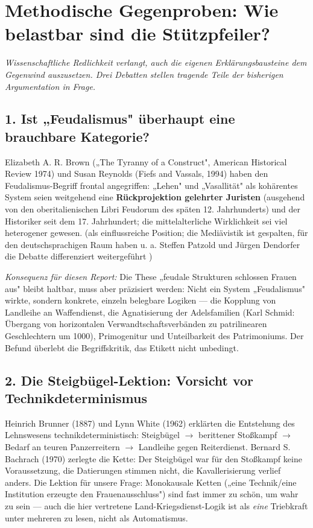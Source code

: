 \documentclass[11pt,a4paper,ngerman]{scrartcl}
\newcommand{\chipbase}[2]{\hspace{0pt}{\footnotesize\textcolor{#1}{[\textsc{#2}]}}}
\newcommand{\chipbelegt}[1]{\chipbase{chipgreen}{#1}}
\newcommand{\chipplausibel}[1]{\chipbase{chipamber}{#1}}
\newcommand{\chipumstritten}[1]{\chipbase{chipred}{#1}}
\begin{document}
\section{Methodische Gegenproben: Wie belastbar sind die Stützpfeiler?}

\noindent\textit{Wissenschaftliche Redlichkeit verlangt, auch die eigenen Erklärungsbausteine dem Gegenwind auszusetzen. Drei Debatten stellen tragende Teile der bisherigen Argumentation in Frage.}
\medskip

\subsection*{1. Ist „Feudalismus" überhaupt eine brauchbare Kategorie?}

Elizabeth A. R. Brown („The Tyranny of a Construct", American Historical Review 1974) und Susan Reynolds (Fiefs and Vassals, 1994) haben den Feudalismus-Begriff frontal angegriffen: „Lehen" und „Vasallität" als kohärentes System seien weitgehend eine \textbf{Rückprojektion gelehrter Juristen} (ausgehend von den oberitalienischen Libri Feudorum des späten 12. Jahrhunderts) und der Historiker seit dem 17. Jahrhundert; die mittelalterliche Wirklichkeit sei viel heterogener gewesen. \chipbelegt{belegt} (als einflussreiche Position; die Mediävistik ist gespalten, für den deutschsprachigen Raum haben u. a. Steffen Patzold und Jürgen Dendorfer die Debatte differenziert weitergeführt \chipumstritten{umstritten})

\emph{Konsequenz für diesen Report:} Die These „feudale Strukturen schlossen Frauen aus" bleibt haltbar, muss aber präzisiert werden: Nicht ein System „Feudalismus" wirkte, sondern konkrete, einzeln belegbare Logiken — die Kopplung von Landleihe an Waffendienst, die Agnatisierung der Adelsfamilien (Karl Schmid: Übergang von horizontalen Verwandtschaftsverbänden zu patrilinearen Geschlechtern um 1000), Primogenitur und Unteilbarkeit des Patrimoniums. Der Befund überlebt die Begriffskritik, das Etikett nicht unbedingt. \chipplausibel{plausibel}

\subsection*{2. Die Steigbügel-Lektion: Vorsicht vor Technikdeterminismus}

Heinrich Brunner (1887) und Lynn White (1962) erklärten die Entstehung des Lehnswesens technikdeterministisch: Steigbügel \(\rightarrow\) berittener Stoßkampf \(\rightarrow\) Bedarf an teuren Panzerreitern \(\rightarrow\) Landleihe gegen Reiterdienst. Bernard S. Bachrach (1970) zerlegte die Kette: Der Steigbügel war für den Stoßkampf keine Voraussetzung, die Datierungen stimmen nicht, die Kavallerisierung verlief anders. \chipbelegt{belegt} Die Lektion für unsere Frage: Monokausale Ketten („eine Technik/eine Institution erzeugte den Frauenausschluss") sind fast immer zu schön, um wahr zu sein — auch die hier vertretene Land-Kriegsdienst-Logik ist als \emph{eine} Triebkraft unter mehreren zu lesen, nicht als Automatismus.
\end{document}
